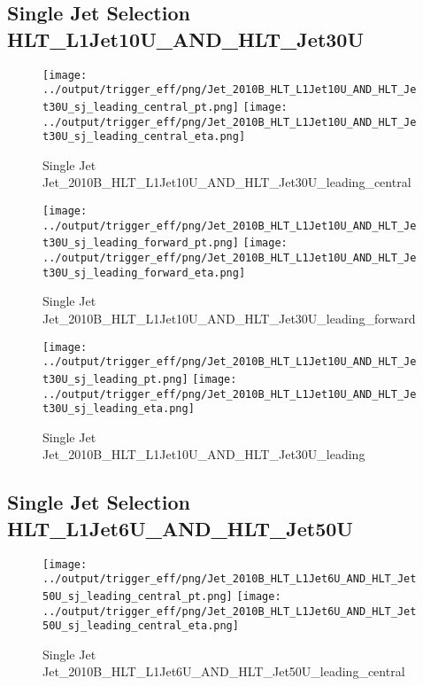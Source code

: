 \documentclass[11pt]{article}
\begin{document}
\newpage
\subsection{Single Jet Selection HLT\_L1Jet10U\_AND\_HLT\_Jet30U}
\begin{figure}[ht]
\centering
\texttt{[image: ../output/trigger\_eff/png/Jet\_2010B\_HLT\_L1Jet10U\_AND\_HLT\_Jet30U\_sj\_leading\_central\_pt.png]}
\texttt{[image: ../output/trigger\_eff/png/Jet\_2010B\_HLT\_L1Jet10U\_AND\_HLT\_Jet30U\_sj\_leading\_central\_eta.png]}
\caption{Single Jet Jet\_2010B\_HLT\_L1Jet10U\_AND\_HLT\_Jet30U\_leading\_central}
\label{fig:jet_sj_L1Jet10U_AND_HLT_Jet30U_leading_central}
\end{figure}

\begin{figure}[ht]
\centering
\texttt{[image: ../output/trigger\_eff/png/Jet\_2010B\_HLT\_L1Jet10U\_AND\_HLT\_Jet30U\_sj\_leading\_forward\_pt.png]}
\texttt{[image: ../output/trigger\_eff/png/Jet\_2010B\_HLT\_L1Jet10U\_AND\_HLT\_Jet30U\_sj\_leading\_forward\_eta.png]}
\caption{Single Jet Jet\_2010B\_HLT\_L1Jet10U\_AND\_HLT\_Jet30U\_leading\_forward}
\label{fig:jet_sj_L1Jet10U_AND_HLT_Jet30U_leading_forward}
\end{figure}

\begin{figure}[ht]
\centering
\texttt{[image: ../output/trigger\_eff/png/Jet\_2010B\_HLT\_L1Jet10U\_AND\_HLT\_Jet30U\_sj\_leading\_pt.png]}
\texttt{[image: ../output/trigger\_eff/png/Jet\_2010B\_HLT\_L1Jet10U\_AND\_HLT\_Jet30U\_sj\_leading\_eta.png]}
\caption{Single Jet Jet\_2010B\_HLT\_L1Jet10U\_AND\_HLT\_Jet30U\_leading}
\label{fig:jet_sj_L1Jet10U_AND_HLT_Jet30U_leading}
\end{figure}


\newpage
\subsection{Single Jet Selection HLT\_L1Jet6U\_AND\_HLT\_Jet50U}
\begin{figure}[ht]
\centering
\texttt{[image: ../output/trigger\_eff/png/Jet\_2010B\_HLT\_L1Jet6U\_AND\_HLT\_Jet50U\_sj\_leading\_central\_pt.png]}
\texttt{[image: ../output/trigger\_eff/png/Jet\_2010B\_HLT\_L1Jet6U\_AND\_HLT\_Jet50U\_sj\_leading\_central\_eta.png]}
\caption{Single Jet Jet\_2010B\_HLT\_L1Jet6U\_AND\_HLT\_Jet50U\_leading\_central}
\label{fig:jet_sj_L1Jet6U_AND_HLT_Jet50U_leading_central}
\end{figure}
\end{document}
